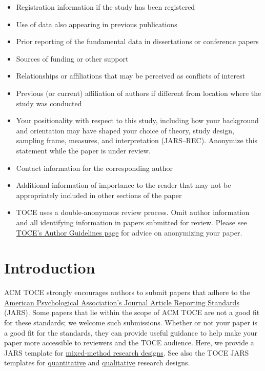 \documentclass[acmsmall,screen,anonymous,review]{acmart}
\begin{document}
\begin{itemize}
    \item Registration information if the study has been registered
    \item Use of data also appearing in previous publications
    \item Prior reporting of the fundamental data in dissertations or conference papers
    \item Sources of funding or other support
    \item Relationships or affiliations that may be perceived as conflicts of interest
    \item Previous (or current) affiliation of authors if different from location where the study  was conducted
    \item Your positionality with respect to this study, including how your background and orientation may have shaped your choice of theory, study design, sampling frame, measures, and interpretation (JARS--REC). Anonymize this statement while the paper is under review.
    \item Contact information for the corresponding author
    \item Additional information of importance to the reader that may not be appropriately included in other sections of the paper
    \item TOCE uses a double-anonymous review process. Omit author information and all identifying information in papers submitted for review. Please see \href{https://dl.acm.org/journal/toce/author-guidelines}{TOCE’s Author Guidelines page} for advice on anonymizing your paper.
\end{itemize}


\section{Introduction}
ACM TOCE strongly encourages authors to submit papers that adhere to the \href{https://apastyle.apa.org/jars/}{American Psychological Association’s Journal Article Reporting Standards}  (JARS).  Some papers that lie within the scope of ACM TOCE are not a good fit for these standards; we welcome such submissions. Whether or not your paper is a good fit for the standards, they can provide useful guidance to help make your paper more accessible to reviewers and the TOCE audience. 
Here, we provide a JARS template for \href{https://apastyle.apa.org/jars/mixed-table-1.pdf}{mixed-method research designs}.  See also the TOCE JARS templates for \href{https://apastyle.apa.org/jars/quantitative}{quantitative} and \href{https://apastyle.apa.org/jars/qualitative}{qualitative} research designs.
\end{document}
